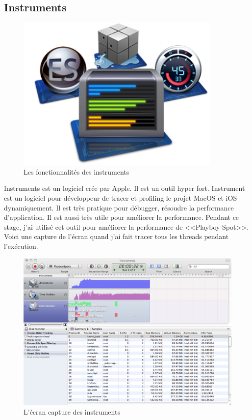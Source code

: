 
\subsection{Instruments} %
\label{sub:instrument}

\begin{figure}[htbp]
	\centering
		\includegraphics[height=3in]{Image/instrumentslogo.jpg}
	\caption{Les fonctionnalités des instruments}
	\label{fig:Image_instrumentslogo}
\end{figure}

Instruments est un logiciel crée par Apple. Il est un outil hyper fort. Instrument est un logiciel pour développeur de tracer et profiling le projet MacOS et iOS dynamiquement. Il est très pratique pour débugger, résoudre la performance d'application. Il est aussi très utile pour améliorer la performance. Pendant ce stage, j'ai utilisé cet outil pour améliorer la performance de <<Playboy-Spot>>. 
Voici une capture de l'écran quand j'ai fait tracer tous les threads pendant l'exécution. 


\begin{figure}[htbp]
	\centering
		\includegraphics[width=6in]{Image/captureInstruments.png}
	\caption{L'écran capture des instruments}
	\label{fig:Image_captureInstruments}
\end{figure}

